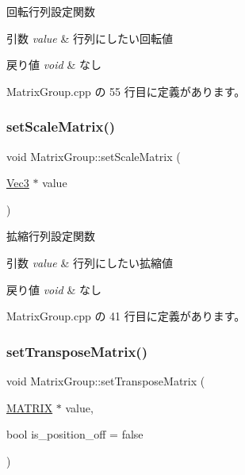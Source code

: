 回転行列設定関数 


\begin{DoxyParams}{引数}
{\em value} & 行列にしたい回転値 \\
\hline
\end{DoxyParams}

\begin{DoxyRetVals}{戻り値}
{\em void} & なし \\
\hline
\end{DoxyRetVals}


 Matrix\+Group.\+cpp の 55 行目に定義があります。

\mbox{\label{class_matrix_group_a16af3b64cf34bfa18a61aadc9cdb2ba9}} 
\subsubsection{\texorpdfstring{set\+Scale\+Matrix()}{setScaleMatrix()}}
{\footnotesize\ttfamily void Matrix\+Group\+::set\+Scale\+Matrix (\begin{DoxyParamCaption}\item[{\mbox{\hyperlink{_vector3_d_8h_ab16f59e4393f29a01ec8b9bbbabbe65d}{Vec3}} $\ast$}]{value }\end{DoxyParamCaption})}



拡縮行列設定関数 


\begin{DoxyParams}{引数}
{\em value} & 行列にしたい拡縮値 \\
\hline
\end{DoxyParams}

\begin{DoxyRetVals}{戻り値}
{\em void} & なし \\
\hline
\end{DoxyRetVals}


 Matrix\+Group.\+cpp の 41 行目に定義があります。

\mbox{\label{class_matrix_group_a7ece21e92a61656dd6989e172d7f86f9}} 
\subsubsection{\texorpdfstring{set\+Transpose\+Matrix()}{setTransposeMatrix()}}
{\footnotesize\ttfamily void Matrix\+Group\+::set\+Transpose\+Matrix (\begin{DoxyParamCaption}\item[{\mbox{\hyperlink{_matrix_8h_a032295cd9fb1b711757c90667278e744}{M\+A\+T\+R\+IX}} $\ast$}]{value,  }\item[{bool}]{is\+\_\+position\+\_\+off = {\ttfamily false} }\end{DoxyParamCaption})}



